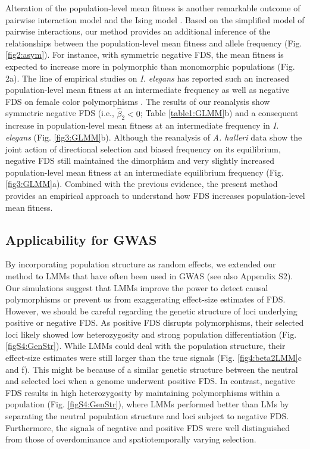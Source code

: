 \documentclass[12pt,]{article}
\begin{document}
Alteration of the population-level mean fitness is another remarkable outcome of pairwise interaction model \citep{cockerham1972frequency,asmussen_frequency-dependent_1990,schneider_maximization_2008,takahashi2018balanced} and the Ising model \citep{cipra1987introduction,sato2019neighbor}. Based on the simplified model of pairwise interactions, our method provides an additional inference of the relationships between the population-level mean fitness and allele frequency (Fig. \ref{fig2:asym}). For instance, with symmetric negative FDS, the mean fitness is expected to increase more in polymorphic than monomorphic populations (Fig. 2a). The line of empirical studies on \textit{I. elegans} has reported such an increased population-level mean fitness at an intermediate frequency \citep{takahashi2014evolution} as well as negative FDS on female color polymorphisms \citep{le2015evolutionary}. The results of our reanalysis show symmetric negative FDS (i.e., $\hat{\beta}_2<0$; Table \ref{table1:GLMM}b) and a consequent increase in population-level mean fitness at an intermediate frequency in \textit{I. elegans} (Fig. \ref{fig3:GLMM}b). Although the reanalysis of \textit{A. halleri} data show the joint action of directional selection and biased frequency on its equilibrium, negative FDS still maintained the dimorphism and very slightly increased population-level mean fitness at an intermediate equilibrium frequency (Fig. \ref{fig3:GLMM}a). Combined with the previous evidence, the present method provides an empirical approach to understand how FDS increases population-level mean fitness.

\subsection{Applicability for GWAS}
By incorporating population structure as random effects, we extended our method to LMMs that have often been used in GWAS \citep{kang2008efficient} (see also Appendix S2). Our simulations suggest that LMMs improve the power to detect causal polymorphisms or prevent us from exaggerating effect-size estimates of FDS. However, we should be careful regarding the genetic structure of loci underlying positive or negative FDS. As positive FDS disrupts polymorphisms, their selected loci likely showed low heterozygosity and strong population differentiation (Fig. \ref{figS4:GenStr}). While LMMs could deal with the population structure, their effect-size estimates were still larger than the true signals (Fig. \ref{fig4:beta2LMM}c and f). This might be because of a similar genetic structure between the neutral and selected loci when a genome underwent positive FDS. In contrast, negative FDS results in high heterozygosity by maintaining polymorphisms within a population (Fig. \ref{figS4:GenStr}), where LMMs performed better than LMs by separating the neutral population structure and loci subject to negative FDS. Furthermore, the signals of negative and positive FDS were well distinguished from those of overdominance and spatiotemporally varying selection.
\end{document}

